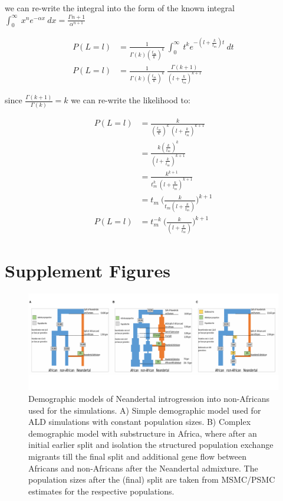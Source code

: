 \documentclass[11pt]{article}
\begin{document}
 
we can re-write the integral into the  form of the known integral $\int_{0}^{\infty}\ x^n e^{-\alpha x} \ dx= \frac{\Gamma{n+1}}{\alpha^{n+1}}$

\begin{equation}
\begin{split}
\label{eq:Likelihood_function_extended_pulse_3}
    P(L=l) &= \frac{1}{\Gamma(k)(\frac{t_m}{k})^k}\ \int_{0}^{\infty}\ t^{k}e^{-(l+\frac{k}{t_m})t} \ dt \\ 
    P(L=l) &= \frac{1}{\Gamma(k)(\frac{t_m}{k})^k}\ \frac{\Gamma(k+1)}{(l+\frac{k}{t_m})^{k+1}} 
\end{split}
\end{equation}

since $\frac{\Gamma(k+1)}{\Gamma(k)} =k$ we can re-write the likelihood to:



\begin{equation}
\begin{split}
\label{eq:Likelihood_function_extended_pulse_final}
    P(L=l) &= \frac{k}{(\frac{t_m}{k})^k \ (l+\frac{k}{t_m})^{k+1}} \\
    &= \frac{k(\frac{k}{t_m})^k} {(l+\frac{k}{t_{m}})^{k+1}}  \\
    &= \frac{k^{k+1}} { t_{m}^k \ (l+\frac{k}{t_{m}})^{k+1}}  \\
    &= t_{m} \ \Bigg( \frac{k}{t_{m}(l+\frac{k}{t_{m}})}\Bigg)^{k+1} \\
    P(L=l) &= t_{m}^{-k} \ \Bigg( \frac{k}{(l+\frac{k}{t_{m}})}\Bigg)^{k+1}
\end{split}
\end{equation}


\section{Supplement Figures}

\begin{figure}
\centering
\includegraphics{Admixture_Time_Inference_Paper_Draft_files/figure-latex/All_3_demo_models.pdf}
\caption{\label{fig:figS1} Demographic models of Neandertal introgression into non-Africans used for the simulations. A) Simple demographic model used for ALD simulations with constant population sizes. B) Complex demographic model with substructure in Africa, where after an initial earlier split and isolation the structured population exchange migrants till the final split and additional gene flow between Africans and non-Africans after the Neandertal admixture. The  population sizes after the (final) split are taken from MSMC/PSMC estimates for the respective populations.}
\end{figure}
\end{document}
